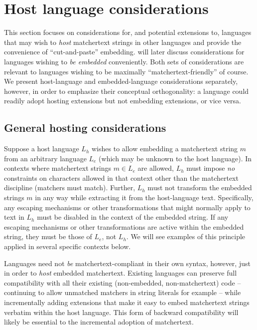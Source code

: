 \section{Host language considerations}
\label{sec:host}

This section focuses on considerations for,
and potential extensions to,
languages that may wish to \emph{host}
matchertext strings in other languages
and provide the convenience of ``cut-and-paste'' embedding.
 will later discuss considerations
for languages wishing to \emph{be embedded} conveniently.
Both sets of considerations are relevant
to languages wishing to be maximally ``matchertext-friendly'' of course.
We present host-language and embedded-language considerations separately,
however,
in order to emphasize their conceptual orthogonality:
a language could readily adopt hosting extensions but not embedding extensions,
or vice versa.


\subsection{General hosting considerations}

Suppose a host language $L_h$ wishes
to allow embedding a matchertext string $m$
from an arbitrary language $L_e$ (which may be unknown to the host language).
In contexts where matchertext strings $m \in L_e$ are allowed,
$L_h$ must impose \emph{no} constraints on characters allowed in that context
other than the matchertext discipline (matchers must match).
Further, $L_h$ must not transform the embedded strings $m$ in any way
while extracting it from the host-language text.
Specifically, any escaping mechanisms or other transformations
that might normally apply to text in $L_h$
must be disabled in the context of the embedded string.
If any escaping mechanisms or other transformations
are active within the embedded string,
they must be those of $L_e$, not $L_h$.
We will see examples of this principle applied
in several specific contexts below.

Languages need not \emph{be} matchertext-compliant in their own syntax,
however,
just in order to \emph{host} embedded matchertext.
Existing languages can preserve full compatibility
with all their existing (non-embedded, non-matchertext) code --
continuing to allow unmatched matchers in string literals for example --
while incrementally adding extensions that make it easy
to embed matchertext strings verbatim within the host language.
This form of backward compatibility will likely be essential
to the incremental adoption of matchertext.

